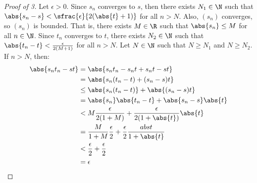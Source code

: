 \begin{thmbox}{}{}
    \begin{proof}[Proof of 3]
        Let $\epsilon > 0$. Since $s_n$ converges to $s$, then there exists $N_1 \in \N$ such that $\abs{s_n - s} < \sfrac{\epsilon}{2(\abs{t} + 1)}$ for all $n > N$. Also, $(s_n)$ converges, so $(s_n)$ is bounded. That is, there exists $M \in \R$ such that $\abs{s_n} \leq M$ for all $n \in \N$. Since $t_n$ converges to $t$, there exists $N_2 \in \N$ such that $\abs{t_n - t} < \frac{\epsilon}{2(M+1)}$ for all $n > N$. Let $N \in \N$ such that $N \geq N_1$ and $N \geq N_2$. If $n > N$, then:
        \begin{align*}
            \abs{s_nt_n - st}
            &= \abs{s_nt_n - s_nt + s_nt - st} \\
            &= \abs{s_n(t_n-t) + (s_n-s)t} \\
            &\leq \abs{s_n(t_n-t)} + \abs{(s_n-s)t} \\
            &= \abs{s_n} \abs{t_n-t} + \abs{s_n-s}\abs{t} \\
            &< M \frac{\epsilon}{2(1+M)} + \frac{\epsilon}{2(1+\abs{t})} \abs{t} \\
            &= \frac{M}{1+M} \frac{\epsilon}{2} + \frac{\epsilon}{2} \frac{abs{t}}{1 + \abs{t}} \\
            &< \frac{\epsilon}{2} + \frac{\epsilon}{2} \\
            &= \epsilon
        \end{align*}
    \end{proof}
\end{thmbox}
